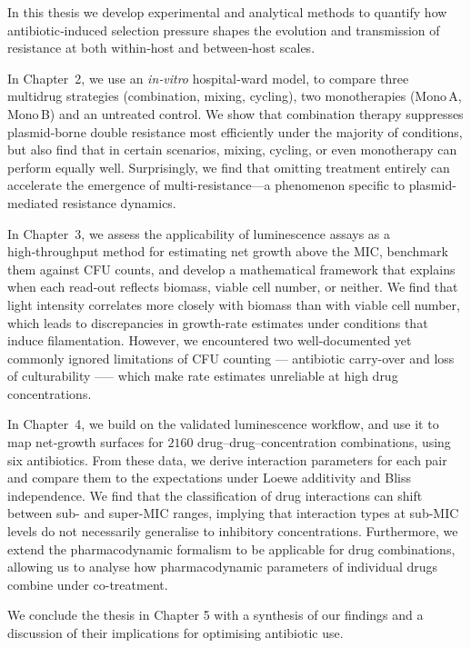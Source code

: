 \documentclass[../main.tex]{subfiles}
\begin{document}
In this thesis we develop experimental and analytical methods to quantify how antibiotic‑induced
selection pressure shapes the evolution and transmission of resistance at both within‑host and between‑host scales.

In Chapter~2, we use an \textit{in‑vitro} hospital‑ward model, to compare three multidrug strategies (combination, mixing, cycling), two monotherapies (Mono A, Mono B) and an untreated control.
We show that combination therapy suppresses plasmid‑borne double resistance most efficiently under the majority of conditions, but also find that in certain scenarios, mixing, cycling, or even monotherapy can perform equally well.
Surprisingly, we find that omitting treatment entirely can accelerate the emergence of multi-resistance—a phenomenon specific to plasmid-mediated resistance dynamics.

In Chapter~3, we assess the applicability of luminescence assays as a high‑throughput method for estimating net growth above the MIC, benchmark them against CFU counts, and develop a mathematical framework that explains when each read‑out reflects biomass, viable cell number, or neither.
We find that light intensity correlates more closely with biomass than with viable cell number, which leads to discrepancies in growth-rate estimates under conditions that induce filamentation.
However, we encountered two well-documented yet commonly ignored limitations of CFU counting --- antibiotic carry-over and loss of culturability --— which make rate estimates unreliable at high drug concentrations.

In Chapter~4, we build on the validated luminescence workflow, and use it to map net‑growth surfaces for $2160$ drug–drug–concentration combinations, using six antibiotics.
From these data, we derive interaction parameters for each pair and compare them to the expectations under Loewe additivity and Bliss independence.
We find that the classification of drug interactions can shift between sub- and super-MIC ranges, implying that interaction types at sub-MIC levels do not necessarily generalise to inhibitory concentrations.
Furthermore, we extend the pharmacodynamic formalism to be applicable for drug combinations, allowing us to analyse how pharmacodynamic parameters of individual drugs combine under co-treatment.

We conclude the thesis in Chapter 5 with a synthesis of our findings and a discussion of their implications for optimising antibiotic use.

\end{document}

